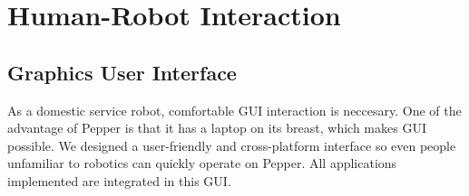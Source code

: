 \section{Human-Robot Interaction}
\label{sec:hri}

\subsection{Graphics User Interface}
\label{subsec:gui}
As a domestic service robot, comfortable GUI interaction is neccesary. 
One of the advantage of Pepper is that it has a laptop on its breast, which makes GUI possible. 
We designed a user-friendly and cross-platform interface so even people unfamiliar to robotics can quickly operate on Pepper. 
All applications implemented are integrated in this GUI.

\begin{figure}[h!]

    \centering
    \hspace{0.2in}
    \\
    
    \hspace{0.2in}


\end{figure}
